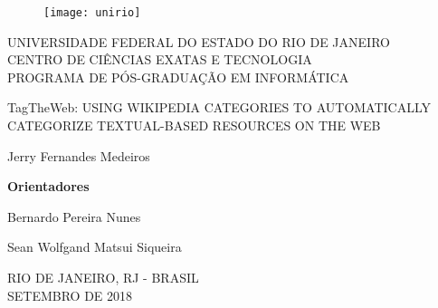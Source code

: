 \begin{figure}[!h]
    \centering
    \texttt{[image: unirio]}
\end{figure}
\begin{center}
    UNIVERSIDADE FEDERAL DO ESTADO DO RIO DE JANEIRO \\ CENTRO DE CIÊNCIAS EXATAS E TECNOLOGIA \\ PROGRAMA DE PÓS-GRADUAÇÃO EM INFORMÁTICA
    \vskip 7.0cm

   TagTheWeb: USING WIKIPEDIA CATEGORIES TO AUTOMATICALLY CATEGORIZE TEXTUAL-BASED RESOURCES ON THE WEB
    \vskip 1.0cm

    Jerry Fernandes Medeiros
    \vskip 2.0cm
\end{center}
\begin{flushright}
    \textbf{Orientadores}

    Bernardo Pereira Nunes

    Sean Wolfgand Matsui Siqueira
\end{flushright}
\begin{center}
    RIO DE JANEIRO, RJ - BRASIL \\ SETEMBRO DE 2018
\end{center}
